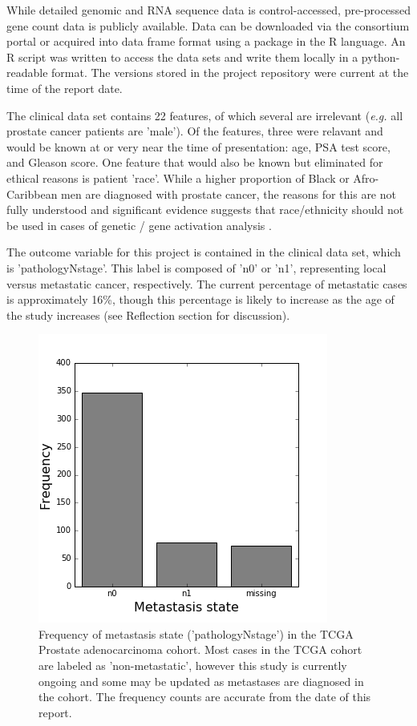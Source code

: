 \documentclass[final]{article}
\begin{document}
While detailed genomic and RNA sequence data is control-accessed, pre-processed
gene count data is publicly available.  Data can be downloaded via the
consortium  portal or acquired into data frame format using a package in the R
language.  An R script was written to access the data sets and write them locally
in a python-readable format.  The versions stored in the project repository were current at
the time of the report date.

The clinical data set contains 22 features, of which several are irrelevant
(\textit{e.g.} all prostate cancer patients are 'male').  Of the features, three were relavant and would be
known at or very near the time of presentation: age, PSA test score, and Gleason
score.  One feature that would also be known but eliminated for ethical reasons is
patient 'race'.  While a higher proportion of Black or Afro-Caribbean men are
diagnosed with prostate cancer, the reasons for this are not fully understood \cite{Shea08} and significant evidence suggests that
race/ethnicity should not be used in cases of genetic / gene activation analysis \cite{Yudel16}.

The outcome variable for this project is contained in the clinical data set,
which is 'pathologyNstage'.  This label is composed of 'n0' or 'n1',
representing local versus metastatic cancer, respectively.  The current
percentage of metastatic cases is approximately 16\%, though this percentage is
likely to increase as the age of the study increases (see Reflection section for
discussion).

\begin{figure}
	\centering
	\includegraphics[scale=0.5]{LabelCount}
  \caption{Frequency of metastasis state ('pathologyNstage') in the TCGA Prostate adenocarcinoma cohort.\label{MetFreq}
  Most cases in the TCGA cohort are labeled as 'non-metastatic', however this study is currently ongoing and
  some may be updated as metastases are diagnosed in the cohort.  The frequency counts are accurate from the
  date of this report.}
\end{figure}
\end{document}
